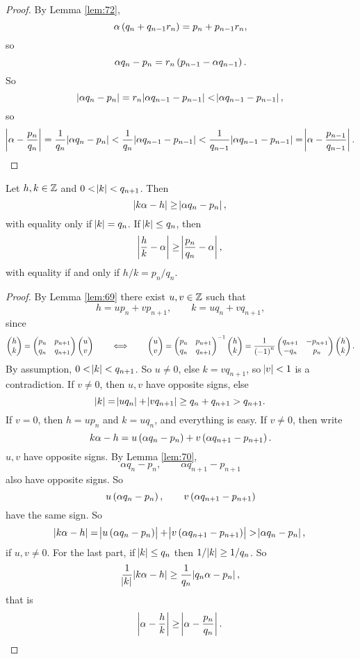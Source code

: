 \begin{proof}
By Lemma \ref{lem:72},
$$ \alpha\br{q_n + q_{n - 1}r_n} = p_n + p_{n - 1}r_n, $$
so
$$ \alpha q_n - p_n = r_n\br{p_{n - 1} - \alpha q_{n - 1}}. $$
So
$$ \abs{\alpha q_n - p_n} = r_n\abs{\alpha q_{n - 1} - p_{n - 1}} < \abs{\alpha q_{n - 1} - p_{n - 1}}, $$
so
$$ \abs{\alpha - \dfrac{p_n}{q_n}} = \dfrac{1}{q_n}\abs{\alpha q_n - p_n} < \dfrac{1}{q_n}\abs{\alpha q_{n - 1} - p_{n - 1}} < \dfrac{1}{q_{n - 1}}\abs{\alpha q_{n - 1} - p_{n - 1}} = \abs{\alpha - \dfrac{p_{n - 1}}{q_{n - 1}}}. $$
\end{proof}

\begin{theorem}
\label{thm:74}
Let $ h, k \in \mathbb{Z} $ and $ 0 < \abs{k} < q_{n + 1} $. Then
$$ \abs{k\alpha - h} \ge \abs{\alpha q_n - p_n}, $$
with equality only if $ \abs{k} = q_n $. If $ \abs{k} \le q_n $, then
$$ \abs{\dfrac{h}{k} - \alpha} \ge \abs{\dfrac{p_n}{q_n} - \alpha}, $$
with equality if and only if $ h / k = p_n / q_n $.
\end{theorem}

\pagebreak

\begin{proof}
By Lemma \ref{lem:69} there exist $ u, v \in \mathbb{Z} $ such that
$$ h = up_n + vp_{n + 1}, \qquad k = uq_n + vq_{n + 1}, $$
since
$$ \twobyone{h}{k} = \twobytwo{p_n}{p_{n + 1}}{q_n}{q_{n + 1}}\twobyone{u}{v} \qquad \iff \qquad \twobyone{u}{v} = \twobytwo{p_n}{p_{n + 1}}{q_n}{q_{n + 1}}^{-1}\twobyone{h}{k} = \dfrac{1}{\br{-1}^n}\twobytwo{q_{n + 1}}{-p_{n + 1}}{-q_n}{p_n}\twobyone{h}{k}. $$
By assumption, $ 0 < \abs{k} < q_{n + 1} $. So $ u \ne 0 $, else $ k = vq_{n + 1} $, so $ \abs{v} < 1 $ is a contradiction. If $ v \ne 0 $, then $ u, v $ have opposite signs, else
$$ \abs{k} = \abs{uq_n} + \abs{vq_{n + 1}} \ge q_n + q_{n + 1} > q_{n + 1}. $$
If $ v = 0 $, then $ h = up_n $ and $ k = uq_n $, and everything is easy. If $ v \ne 0 $, then write
$$ k\alpha - h = u\br{\alpha q_n - p_n} + v\br{\alpha q_{n + 1} - p_{n + 1}}. $$
$ u, v $ have opposite signs. By Lemma \ref{lem:70},
$$ \alpha q_n - p_n, \qquad \alpha q_{n + 1} - p_{n + 1} $$
also have opposite signs. So
$$ u\br{\alpha q_n - p_n}, \qquad v\br{\alpha q_{n + 1} - p_{n + 1}} $$
have the same sign. So
$$ \abs{k\alpha - h} = \abs{u\br{\alpha q_n - p_n}} + \abs{v\br{\alpha q_{n + 1} - p_{n + 1}}} > \abs{\alpha q_n - p_n}, $$
if $ u, v \ne 0 $. For the last part, if $ \abs{k} \le q_n $ then $ 1 / \abs{k} \ge 1 / q_n $. So
$$ \dfrac{1}{\abs{k}}\abs{k\alpha - h} \ge \dfrac{1}{q_n}\abs{q_n\alpha - p_n}, $$
that is
$$ \abs{\alpha - \dfrac{h}{k}} \ge \abs{\alpha - \dfrac{p_n}{q_n}}. $$
\end{proof}

